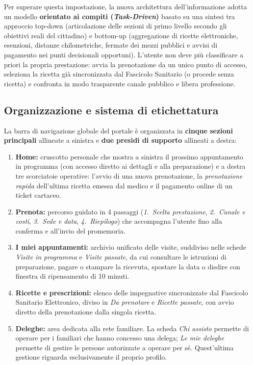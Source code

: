 Per superare questa impostazione, la nuova architettura dell'informazione adotta un modello \textbf{orientato ai compiti (\emph{Task-Driven})} basato su una sintesi tra approccio top-down (articolazione delle sezioni di primo livello secondo gli obiettivi reali del cittadino) e bottom-up (aggregazione di ricette elettroniche, esenzioni, distanze chilometriche, fermate dei mezzi pubblici e avvisi di pagamento nei punti decisionali opportuni). L'utente non deve più classificare a priori la propria prestazione: avvia la prenotazione da un unico punto di accesso, seleziona la ricetta già sincronizzata dal Fascicolo Sanitario (o procede senza ricetta) e confronta in modo trasparente canale pubblico e libera professione.

\subsection{Organizzazione e sistema di etichettatura}

La barra di navigazione globale del portale è organizzata in \textbf{cinque sezioni principali} allineate a sinistra e \textbf{due presidi di supporto} allineati a destra:
\begin{enumerate}
\item \textbf{Home:} cruscotto personale che mostra a sinistra il prossimo appuntamento in programma (con accesso diretto ai dettagli e alla preparazione) e a destra tre scorciatoie operative: l'avvio di una nuova prenotazione, la \emph{prenotazione rapida} dell'ultima ricetta emessa dal medico e il pagamento online di un ticket cartaceo.
\item \textbf{Prenota:} percorso guidato in 4 passaggi (\emph{1.\ Scelta prestazione}, \emph{2.\ Canale e costi}, \emph{3.\ Sede e data}, \emph{4.\ Riepilogo}) che accompagna l'utente fino alla conferma e all'invio del promemoria.
\item \textbf{I miei appuntamenti:} archivio unificato delle visite, suddiviso nelle schede \emph{Visite in programma} e \emph{Visite passate}, da cui consultare le istruzioni di preparazione, pagare o stampare la ricevuta, spostare la data o disdire con finestra di ripensamento di 10 minuti.
\item \textbf{Ricette e prescrizioni:} elenco delle impegnative sincronizzate dal Fascicolo Sanitario Elettronico, diviso in \emph{Da prenotare} e \emph{Ricette passate}, con avvio diretto della prenotazione dalla singola ricetta.
\item \textbf{Deleghe:} area dedicata alla rete familiare. La scheda \emph{Chi assisto} permette di operare per i familiari che hanno concesso una delega; \emph{Le mie deleghe} permette di gestire le persone autorizzate a operare per sé. Quest'ultima gestione riguarda esclusivamente il proprio profilo.
\end{enumerate}

